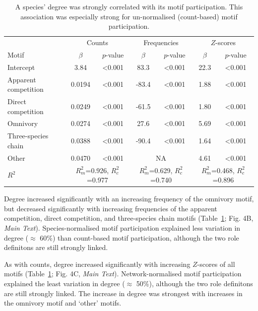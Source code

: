 \documentclass[12pt]{article}
\begin{document}
\begin{spacing}{2.0}
			\begin{table}[h!]
    			\caption{A species' degree was strongly correlated with its motif participation. This association was especially strong for un-normalised (count-based) motif participation.}
    			\label{tab:motifs_vs_deg}
    			\begin{tabular}{l | c c | c c | c c}
    			& \multicolumn{2}{c|}{Counts} & \multicolumn{2}{c}{Frequencies} & \multicolumn{2}{|c}{$Z$-scores} \\
    			Motif & $\beta$ & $p$-value & $\beta$ & $p$-value & $\beta$ & $p$-value \\
    			\hline
    			Intercept &  3.84  & \textless0.001 & 83.3 & \textless0.001 & 22.3 & \textless0.001\\
    			\hline
    			Apparent competition       &  0.0194  & \textless0.001 & -83.4 & \textless0.001 & 1.88 & \textless0.001 \\
    			Direct competition       &  0.0249  & \textless0.001 & -61.5 & \textless0.001 & 1.80 & \textless0.001\\
    			Omnivory       &  0.0274  & \textless0.001 & 27.6 & \textless0.001 & 5.69 & \textless0.001\\
    			Three-species chain       &  0.0388  & \textless0.001 & -90.4 & \textless0.001 & 1.64 & \textless0.001\\
    			Other    &  0.0470  & \textless0.001 & \multicolumn{2}{c|}{NA} & 4.61 & \textless0.001 \\
    			\hline
    			$R^2$ & \multicolumn{2}{c|}{\tiny{$R^2_m$=0.926, $R^2_c$=0.977}} & \multicolumn{2}{c}{\tiny{$R^2_m$=0.629, $R^2_c$=0.740}} & \multicolumn{2}{|c}{\tiny{$R^2_m$=0.468, $R^2_c$=0.896}} \\
    			\end{tabular}
    			\end{table}


			Degree increased significantly with an increasing frequency of the omnivory motif, but decreased significantly with increasing frequencies of the apparent competition, direct competition, and three-species chain motifs (Table~\ref{tab:motifs_vs_deg}; Fig. 4B, \emph{Main Text}).
			Species-normalised motif participation explained less variation in degree ($\approx$ 60\%) than count-based motif participation, although the two role definitons are still strongly linked.


			As with counts, degree increased significantly with increasing $Z$-scores of all motifs (Table~\ref{tab:motifs_vs_deg}; Fig. 4C, \emph{Main Text}).
			Network-normalised motif participation explained the least variation in degree ($\approx$ 50\%), although the two role definitons are still strongly linked.
			The increase in degree was strongest with increases in the omnivory motif and `other' motifs.



\end{spacing}
\end{document}
